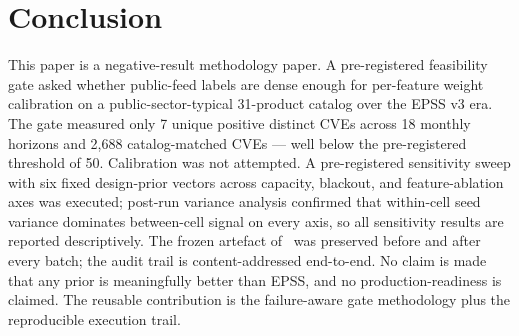 \section{Conclusion}
This paper is a negative-result methodology paper. A pre-registered feasibility gate asked whether public-feed labels are dense enough for per-feature weight calibration on a public-sector-typical 31-product catalog over the EPSS v3 era. The gate measured only 7 unique positive distinct CVEs across 18 monthly horizons and 2,688 catalog-matched CVEs — well below the pre-registered threshold of 50. Calibration was not attempted. A pre-registered sensitivity sweep with six fixed design-prior vectors across capacity, blackout, and feature-ablation axes was executed; post-run variance analysis confirmed that within-cell seed variance dominates between-cell signal on every axis, so all sensitivity results are reported descriptively. The frozen artefact of~\cite{Malla2026VulnPrio} was preserved before and after every batch; the audit trail is content-addressed end-to-end. No claim is made that any prior is meaningfully better than EPSS, and no production-readiness is claimed. The reusable contribution is the failure-aware gate methodology plus the reproducible execution trail.
